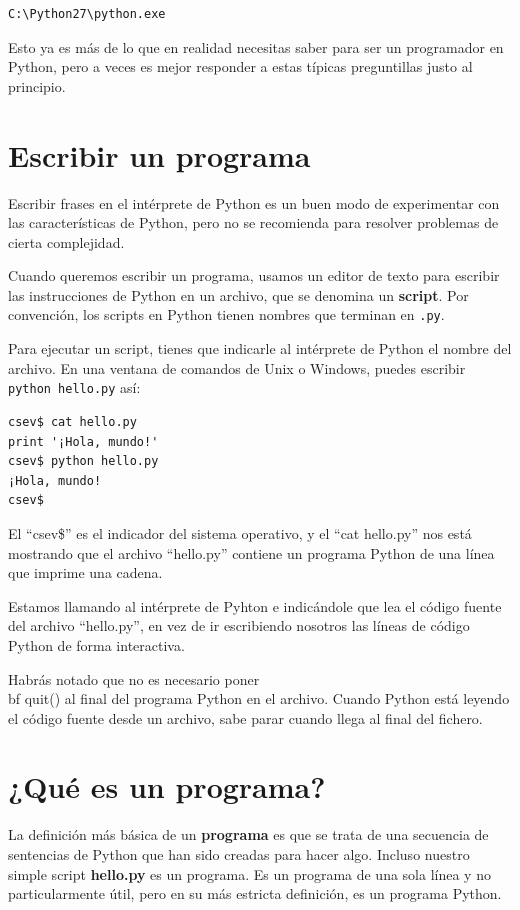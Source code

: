 \beforeverb
\begin{verbatim}
C:\Python27\python.exe
\end{verbatim}
\afterverb
%
Esto ya es más de lo que en realidad necesitas saber para ser un programador en Python,
pero a veces es mejor responder a estas típicas preguntillas justo
al principio.

\section{Escribir un programa}

Escribir frases en el intérprete de Python es un buen modo de experimentar
con las características de Python, pero no se recomienda para resolver problemas
de cierta complejidad.

Cuando queremos escribir un programa,
usamos un editor de texto para escribir las instrucciones de Python en un archivo,
que se denomina un {\bf script}. Por
convención, los scripts en Python tienen nombres que terminan en {\tt .py}.


Para ejecutar un script, tienes que indicarle al intérprete de Python
el nombre del archivo. En una ventana de comandos de Unix o Windows,
puedes escribir {\tt python hello.py} así:

\beforeverb
\begin{verbatim}
csev$ cat hello.py
print '¡Hola, mundo!'
csev$ python hello.py
¡Hola, mundo!
csev$
\end{verbatim}
\afterverb
%
El ``csev\$'' es el indicador del sistema operativo, y el ``cat hello.py'' nos
está mostrando que el archivo ``hello.py'' contiene un programa Python de una línea
que imprime una cadena.

Estamos llamando al intérprete de Pyhton e indicándole que lea el código fuente del
archivo ``hello.py'', en vez de ir escribiendo nosotros las líneas de código Python
de forma interactiva.

Habrás notado que no es necesario poner {\\bf quit()} al final del programa
Python en el archivo. Cuando Python está leyendo el código fuente
desde un archivo, sabe parar cuando llega al final del fichero.

\section{¿Qué es un programa?}

La definición más básica de un {\bf programa} es que se trata de una
secuencia de sentencias de Python que han sido creadas para hacer algo.
Incluso nuestro simple script {\bf hello.py} es un programa. Es un programa
de una sola línea y no particularmente útil, pero en su más estricta definición,
es un programa Python. 

